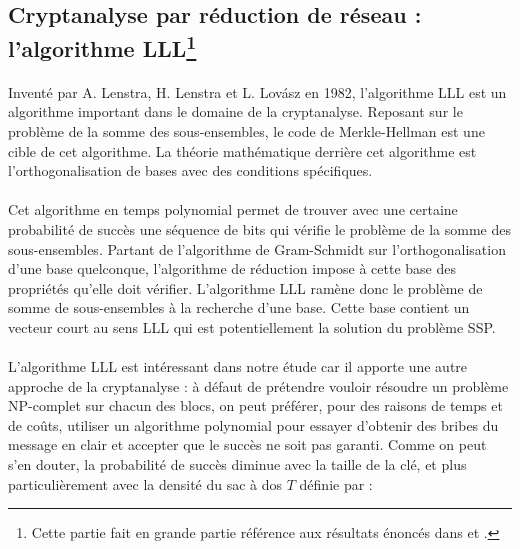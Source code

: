\subsection[Cryptanalyse par réduction de réseau : l'algorithme LLL]{Cryptanalyse par réduction de réseau : l'algorithme LLL\protect\footnote{Cette partie fait en grande partie référence aux résultats énoncés dans \cite{MARTIN2004} et \cite{opac}.}}

\label{lll}

\paragraph{}Inventé par A. Lenstra, H. Lenstra et L. Lovász en 1982, l'algorithme LLL est un algorithme important dans le domaine de la cryptanalyse. Reposant sur le problème de la somme des sous-ensembles, le code de Merkle-Hellman est une cible de cet algorithme. La théorie mathématique derrière cet algorithme est l'orthogonalisation de bases avec des conditions spécifiques. 

\paragraph{}Cet algorithme en temps polynomial permet de trouver avec une certaine probabilité de succès une séquence de bits qui vérifie le problème de la somme des sous-ensembles. Partant de l'algorithme de Gram-Schmidt sur l'orthogonalisation d'une base quelconque, l'algorithme de réduction impose à cette base des propriétés qu'elle doit vérifier. L'algorithme LLL ramène donc le problème de somme de sous-ensembles à la recherche d'une base. Cette base contient un vecteur court au sens LLL qui est potentiellement la solution du problème SSP.

\paragraph{}L'algorithme LLL est intéressant dans notre étude car il apporte une autre approche de la cryptanalyse : à défaut de prétendre vouloir résoudre un problème NP-complet sur chacun des blocs, on peut préférer, pour des raisons de temps et de coûts, utiliser un algorithme polynomial pour essayer d'obtenir des bribes du message en clair et accepter que le succès ne soit pas garanti. Comme on peut s'en douter, la probabilité de succès diminue avec la taille de la clé, et plus particulièrement avec la densité du sac à dos $T$ définie par :

